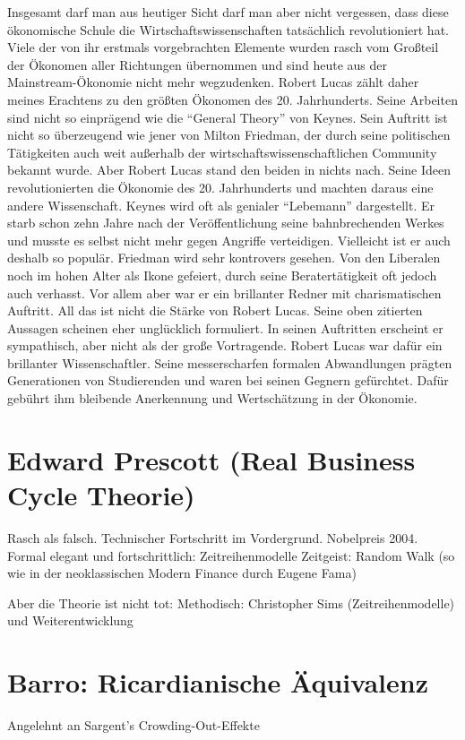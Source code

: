 Insgesamt darf man aus heutiger Sicht darf man aber nicht vergessen, dass diese ökonomische Schule die Wirtschaftswissenschaften tatsächlich revolutioniert hat. Viele der von ihr erstmals vorgebrachten Elemente wurden rasch vom Großteil der Ökonomen aller Richtungen übernommen und sind heute aus der Mainstream-Ökonomie nicht mehr wegzudenken. Robert Lucas zählt daher meines Erachtens zu den größten Ökonomen des 20. Jahrhunderts. Seine Arbeiten sind nicht so einprägend wie die "`General Theory"' von Keynes. Sein Auftritt ist nicht so überzeugend wie jener von Milton Friedman, der durch seine politischen Tätigkeiten auch weit außerhalb der wirtschaftswissenschaftlichen Community bekannt wurde. Aber Robert Lucas stand den beiden in nichts nach. Seine Ideen revolutionierten die Ökonomie des 20. Jahrhunderts und machten daraus eine andere Wissenschaft. Keynes wird oft als genialer "`Lebemann"' dargestellt. Er starb schon zehn Jahre nach der Veröffentlichung seine bahnbrechenden Werkes und musste es selbst nicht mehr gegen Angriffe verteidigen. Vielleicht ist er auch deshalb so populär. Friedman wird sehr kontrovers gesehen. Von den Liberalen noch im hohen Alter als Ikone gefeiert, durch seine Beratertätigkeit oft jedoch auch verhasst. Vor allem aber war er ein brillanter Redner mit charismatischen Auftritt. All das ist nicht die Stärke von Robert Lucas. Seine oben zitierten Aussagen scheinen eher unglücklich formuliert. In seinen Auftritten erscheint er sympathisch, aber nicht als der große Vortragende. Robert Lucas war dafür ein brillanter Wissenschaftler. Seine messerscharfen formalen Abwandlungen prägten Generationen von Studierenden und waren bei seinen Gegnern gefürchtet. Dafür gebührt ihm bleibende Anerkennung und Wertschätzung in der Ökonomie.


\section{Edward Prescott (Real Business Cycle Theorie)}
\label{RBC}
Rasch als falsch. Technischer Fortschritt im Vordergrund. Nobelpreis 2004.
Formal elegant und fortschrittlich: Zeitreihenmodelle
Zeitgeist: Random Walk (so wie in der neoklassischen Modern Finance durch Eugene Fama)

Aber die Theorie ist nicht tot:
Methodisch: Christopher Sims (Zeitreihenmodelle) und Weiterentwicklung 


\section{Barro: Ricardianische Äquivalenz}
Angelehnt an Sargent's \cite{Sargent1975}
Crowding-Out-Effekte

